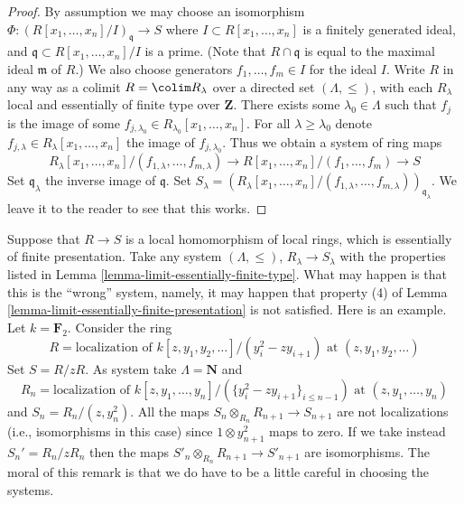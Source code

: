 \begin{proof}
By assumption we may choose an isomorphism
$\Phi : (R[x_1, \ldots, x_n]/I)_{\mathfrak q} \to S$
where $I \subset R[x_1, \ldots, x_n]$ is a finitely generated ideal,
and $\mathfrak q \subset R[x_1, \ldots, x_n]/I$ is a prime.
(Note that $R \cap \mathfrak q$
is equal to the maximal ideal $\mathfrak m$ of $R$.)
We also choose generators $f_1, \ldots, f_m \in I$ for the ideal $I$.
Write $R$ in any way as a colimit $R = \colim R_\lambda$
over a directed set $(\Lambda, \leq )$, with each $R_\lambda$
local and essentially of finite type over $\mathbf{Z}$.
There exists some $\lambda_0 \in \Lambda$ such that $f_j$ is the image
of some $f_{j, \lambda_0} \in R_{\lambda_0}[x_1, \ldots, x_n]$.
For all $\lambda \geq \lambda_0$ denote
$f_{j, \lambda} \in R_{\lambda}[x_1, \ldots, x_n]$ the image
of $f_{j, \lambda_0}$. Thus we obtain a system of ring maps
$$
R_\lambda[x_1, \ldots, x_n]/(f_{1, \lambda}, \ldots, f_{m, \lambda})
\to
R[x_1, \ldots, x_n]/(f_1, \ldots, f_m) \to S
$$
Set $\mathfrak q_\lambda$ the inverse image of $\mathfrak q$.
Set $S_\lambda = (R_\lambda[x_1, \ldots, x_n]/
(f_{1, \lambda}, \ldots, f_{m, \lambda}))_{\mathfrak q_\lambda}$.
We leave it to the reader to see that this works.
\end{proof}

\begin{remark}
\label{remark-suitable-systems-limits}
Suppose that $R \to S$ is a local homomorphism
of local rings, which is essentially of finite presentation.
Take any system $(\Lambda, \leq)$, $R_\lambda \to S_\lambda$
with the properties listed in
Lemma \ref{lemma-limit-essentially-finite-type}.
What may happen is that this is the ``wrong'' system, namely,
it may happen that property (4) of
Lemma \ref{lemma-limit-essentially-finite-presentation} is not
satisfied. Here is an example. Let $k = \mathbf{F}_2$. Consider the ring
$$
R = \text{localization of }
k[z, y_1, y_2, \ldots]/(y_i^2 - zy_{i + 1})
\text{ at }(z, y_1, y_2, \ldots)
$$
Set $S = R/zR$. As system take $\Lambda = \mathbf{N}$ and
$$
R_n = \text{localization of }
k[z, y_1, \ldots, y_n]/(\{y_i^2 - zy_{i + 1}\}_{i \leq n-1})
\text{ at }(z, y_1, \ldots, y_n)
$$
and $S_n = R_n/(z, y_n^2)$. All the maps
$S_n \otimes_{R_n} R_{n + 1} \to S_{n + 1}$
are not localizations (i.e., isomorphisms in this case)
since $1 \otimes y_{n + 1}^2$ maps to zero.
If we take instead $S_n' = R_n/zR_n$ then the
maps $S'_n \otimes_{R_n} R_{n + 1} \to S'_{n + 1}$ are
isomorphisms. The moral of this remark is that we do have to be
a little careful in choosing the systems.
\end{remark}

